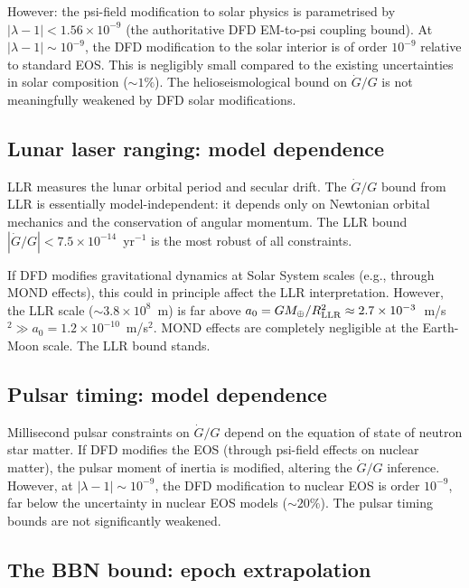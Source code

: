 \documentclass[11pt]{article}
\newcommand{\ee}[1]{\times 10^{#1}}
\begin{document}
However: the psi-field modification to solar physics is parametrised by
$|\lambda - 1| < 1.56\ee{-9}$ (the authoritative DFD EM-to-psi coupling bound).
At $|\lambda - 1| \sim 10^{-9}$, the DFD modification to the solar interior
is of order $10^{-9}$ relative to standard EOS. This is negligibly small
compared to the existing uncertainties in solar composition ($\sim 1\%$). The
helioseismological bound on $\dot{G}/G$ is not meaningfully weakened by DFD
solar modifications.

\subsection{Lunar laser ranging: model dependence}

LLR measures the lunar orbital period and secular drift. The $\dot{G}/G$ bound
from LLR is essentially model-independent: it depends only on Newtonian orbital
mechanics and the conservation of angular momentum. The LLR bound
$|\dot{G}/G| < 7.5\ee{-14}$~yr$^{-1}$ is the most robust of all constraints.

If DFD modifies gravitational dynamics at Solar System scales (e.g., through
MOND effects), this could in principle affect the LLR interpretation. However,
the LLR scale ($\sim 3.8\ee{8}$~m) is far above $a_0 = GM_\oplus/R_{\rm LLR}^2
\approx 2.7\ee{-3}$~m/s$^2 \gg a_0 = 1.2\ee{-10}$~m/s$^2$. MOND effects
are completely negligible at the Earth-Moon scale. The LLR bound stands.

\subsection{Pulsar timing: model dependence}

Millisecond pulsar constraints on $\dot{G}/G$ depend on the equation of state
of neutron star matter. If DFD modifies the EOS (through psi-field effects on
nuclear matter), the pulsar moment of inertia is modified, altering the $\dot{G}/G$
inference. However, at $|\lambda - 1| \sim 10^{-9}$, the DFD modification to
nuclear EOS is order $10^{-9}$, far below the uncertainty in nuclear EOS
models ($\sim 20\%$). The pulsar timing bounds are not significantly weakened.

\subsection{The BBN bound: epoch extrapolation}
\end{document}
